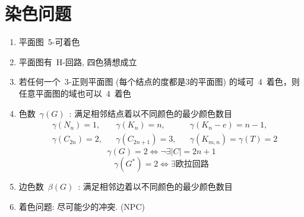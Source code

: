 \documentclass[11pt,a4paper]{article}%
\renewcommand{\[}{~$}
\renewcommand{\]}{$~}%
\begin{document}
\section{染色问题}
	\begin{enumerate}
	 \item 平面图~5-可着色
	 \item 平面图有~H-回路, 四色猜想成立
	 \item 若任何一个~3-正则平面图 (每个结点的度都是3的平面图) 的域可\[4\]着色，则任意平面图的域也可以\[4\]着色
	 \item 色数\[\gamma(G)\]: 满足相邻结点着以不同颜色的最少颜色数目\\
	 	\begin{align*}		 	
	 	 &\gamma(N_n) = 1, &&\gamma(K_n) = n, &&\gamma(K_n - e) = n-1, \\
	 	 &\gamma(C_{2n}) = 2, &&\gamma(C_{2n+1}) = 3, &&\gamma(K_{m,n}) = \gamma(T) = 2
	 	\end{align*}
	 	$$\gamma(G) = 2 \Leftrightarrow \lnot \exists |C| = 2n+1$$
	 	$$\gamma(G^*) = 2 \Leftrightarrow \exists \mbox{欧拉回路}$$
	 \item 边色数\[\beta(G)\]: 满足相邻边着以不同颜色的最少颜色数目
	 \item 着色问题: 尽可能少的冲突. (NPC)
	\end{enumerate}
	
\end{document}
